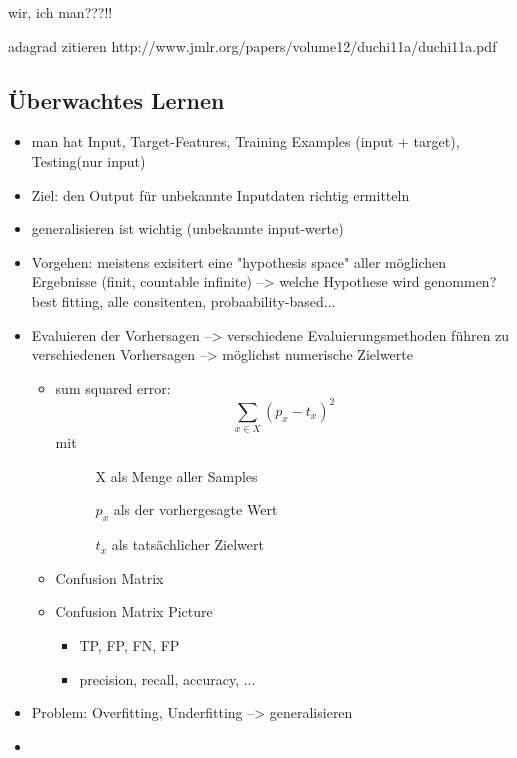 wir, ich man???!!

adagrad zitieren
http://www.jmlr.org/papers/volume12/duchi11a/duchi11a.pdf




\subsection{Überwachtes Lernen}
    \begin{itemize}
        \item man hat Input, Target-Features, Training Examples (input + target), Testing(nur input)
        \item Ziel: den Output für unbekannte Inputdaten richtig ermitteln
        \item generalisieren ist wichtig (unbekannte input-werte)
        \item Vorgehen: meistens exisitert eine "hypothesis space" aller möglichen Ergebnisse (finit, countable infinite) \cite{poole-artificial-intelligence}
            --> welche Hypothese wird genommen? best fitting, alle consitenten, probaability-based...
        \item Evaluieren der Vorhersagen
            --> verschiedene Evaluierungsmethoden führen zu verschiedenen Vorhersagen
            --> möglichst numerische Zielwerte

        \begin{itemize}
            \item sum squared error:
                    $$ \sum_{x \in X} (p_x - t_x)^2$$
                    mit
                    \begin{description}
                        \item[] X als Menge aller Samples
                        \item[] $p_x$ als der vorhergesagte Wert
                        \item[] $t_x$ als tatsächlicher Zielwert
                    \end{description}
            \item Confusion Matrix
            \item Confusion Matrix Picture\todo
            \begin{itemize}
                \item TP, FP, FN, FP
                \item precision, recall, accuracy, ...
            \end{itemize}
        \end{itemize}

        \item Problem: Overfitting, Underfitting --> generalisieren
        \item
    \end{itemize}

